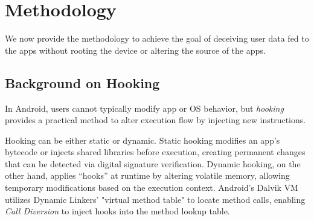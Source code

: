\section{\framework{} Methodology}
\label{sec:methodology}

We now provide the methodology to achieve the goal of deceiving user data fed to the apps without rooting the device or altering the source of the apps.

\subsection{Background on Hooking}
In Android, users cannot typically modify app or OS behavior, but \textit{hooking} provides a practical method to alter execution flow by injecting new instructions.

Hooking can be either static or dynamic. Static hooking modifies an app's bytecode or injects shared libraries before execution, creating permanent changes that can be detected via digital signature verification. Dynamic hooking, on the other hand, applies “hooks” at runtime by altering volatile memory, allowing temporary modifications based on the execution context. Android's Dalvik VM utilizes Dynamic Linkers' "virtual method table" to locate method calls, enabling \textit{Call Diversion} to inject hooks into the method lookup table.


